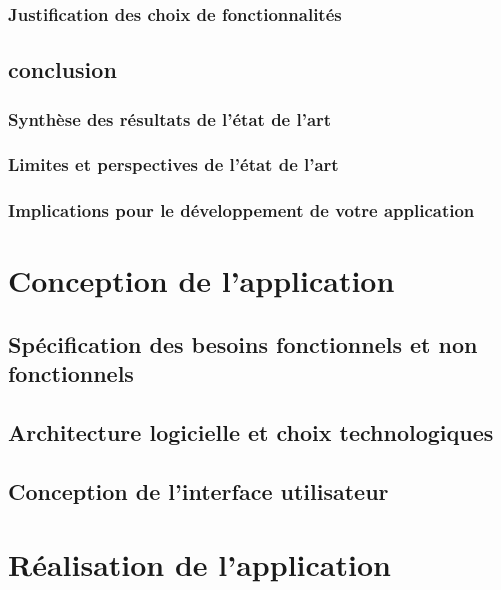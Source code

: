 \documentclass[12pt, a4paper]{report}
\begin{document}
    \subsection{Justification des choix de fonctionnalités}\label{subsec:justification-des-choix-de-fonctionnalites-pour-votre-application}
    \section{conclusion}\label{sec:conclusion}
    \subsection{Synthèse des résultats de l'état de l'art}\label{subsec:synthese-des-resultats-de-l-etat-de-l-art}
    \subsection{Limites et perspectives de l'état de l'art}\label{subsec:limites-et-perspectives-de-l-etat-de-l-art}
    \subsection{Implications pour le développement de votre application}\label{subsec:implications-pour-le-developpement-de-votre-application}
    
    \chapter{Conception de l'application}\label{cha:conception-de-l-application}
    \section{Spécification des besoins fonctionnels et non fonctionnels}\label{sec:specification-des-besoins-fonctionnels-et-non-fonctionnels}
    \section{Architecture logicielle et choix technologiques}\label{sec:architecture-logicielle-et-choix-technologiques}
    \section{Conception de l'interface utilisateur}\label{sec:conception-de-l-interface-utilisateur}

    \chapter{Réalisation de l'application}\label{cha:realisation-de-l-application}
\end{document}
